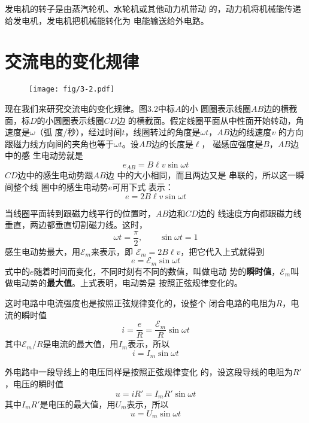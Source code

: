 发电机的转子是由蒸汽轮机、水轮机或其他动力机带动
的，动力机将机械能传递给发电机，发电机把机械能转化为
电能输送给外电路。

\section{交流电的变化规律}

\begin{figure}[htp]\centering
    \texttt{[image: fig/3-2.pdf]}
    \caption{}
    \end{figure}

现在我们来研究交流电的变化规律。图3.2中标$A$的小
圆圈表示线圈$AB$边的横截面，标$D$的小圆圈表示线圈$CD$边
的横截面。假定线圈平面从中性面开始转动，角速度是$\omega$（弧
度/秒），经过时间$t$，线圈转过的角度是$\omega t$，$AB$边的线速度$v$
的方向跟磁力线方向间的夹角也等于$\omega t$。设$AB$边的长度是$\ell$，
磁感应强度是$B$，$AB$边中的感
生电动势就是
\[e_{AB}=B\ell v\sin \omega t\]
$CD$边中的感生电动势跟$AB$边
中的大小相同，而且两边又是
串联的，所以这一瞬间整个线
圈中的感生电动势$e$可用下式
表示：
\[e=2B\ell v\sin \omega t\]

当线圈平面转到跟磁力线平行的位置时，$AB$边和$CD$边的
线速度方向都跟磁力线垂直，两边都垂直切割磁力线。这时，
\[\omega t=\frac{\pi}{2},\qquad \sin \omega t=1 \]
感生电动势最大，用$\mathcal{E}_m$来表示，即
$\mathcal{E}_m=2B\ell v$，把它代入上式就得到
\begin{equation}
    e=\mathcal{E}_m \sin\omega t
\end{equation}
式中的$e$随着时间而变化，不同时刻有不同的数值，叫做电动
势的\textbf{瞬时值}，$\mathcal{E}_m$叫做电动势的\textbf{最大值}。上式表明，电动势是
按照正弦规律变化的。

这时电路中电流强度也是按照正弦规律变化的，设整个
闭合电路的电阻为$R$，电流的瞬时值
\[i=\frac{e}{R}=\frac{\mathcal{E}_m}{R} \sin\omega t \]
其中$\mathcal{E}_m/R$是电流的最大值，用$I_m$表示，所以
\begin{equation}
    i=I_m \sin\omega t
\end{equation}

外电路中一段导线上的电压同样是按照正弦规律变化
的，设这段导线的电阻为$R'$，电压的瞬时值
\[u=iR'=I_mR'\sin\omega t \]
其中$I_mR'$是电压的最大值，用$U_m$表示，所以
\begin{equation}
    u=U_m \sin\omega t
\end{equation}

